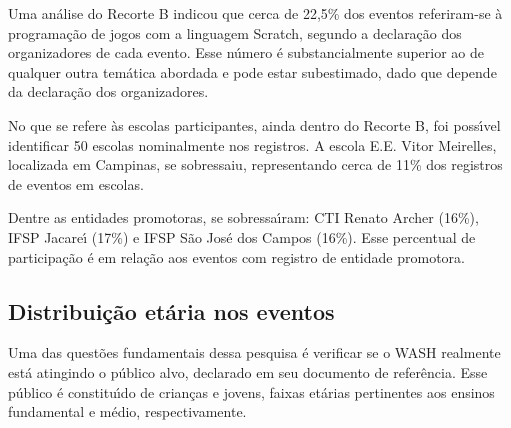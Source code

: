 \documentclass[
12pt,		%
openright,	%
twoside,  %
a4paper,			%
chapter=TITLE,		%
english,			%
french,				%
spanish,			%
brazil				%
]{USPSC-classe/USPSC}
\begin{document}
Uma an\'alise do Recorte B indicou que cerca de 22,5\% dos eventos referiram-se \`a programa\c{c}\~ao de jogos com a linguagem Scratch, segundo a declara\c{c}\~ao dos organizadores de cada evento. Esse n\'umero \'e substancialmente superior ao de qualquer outra tem\'atica abordada e pode estar subestimado, dado que depende da declara\c{c}\~ao dos organizadores.

















No que se refere \`as escolas participantes, ainda dentro do Recorte B, foi poss\'{\i}vel identificar 50 escolas nominalmente nos registros. A escola E.E. Vitor Meirelles,  localizada em Campinas, se sobressaiu, representando cerca de 11\% dos registros de eventos em escolas.

















Dentre as entidades promotoras, se sobressa\'{\i}ram: CTI Renato Archer (16\%), IFSP Jacare\'{\i} (17\%) e IFSP S\~ao Jos\'e dos Campos (16\%). Esse percentual de participa\c{c}\~ao \'e em rela\c{c}\~ao aos eventos com registro de entidade promotora.

















\subsection[Distribui\c{c}\~ao et\'aria nos eventos]{Distribui\c{c}\~ao et\'aria nos eventos}\label{Distribui\c{c}\~ao et\'aria nos eventos}
Uma das quest\~oes fundamentais dessa pesquisa \'e verificar se o WASH realmente est\'a atingindo o p\'ublico alvo, declarado em seu documento de refer\^encia. Esse p\'ublico \'e constitu\'{\i}do de crian\c{c}as e jovens, faixas et\'arias pertinentes aos ensinos fundamental e m\'edio, respectivamente.
\end{document}
